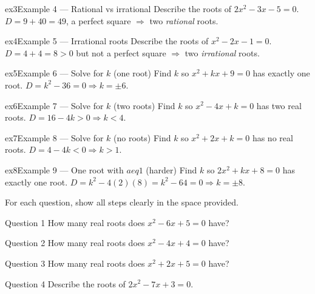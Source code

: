 \documentclass[11pt]{article}
\begin{document}
\begin{example}{ex3}{Example 4 --- Rational vs irrational}
Describe the roots of $2x^2-3x-5=0$.
\soln $D=9+40=49$, a perfect square $\Rightarrow$ two \emph{rational} roots.
\end{example}

\begin{example}{ex4}{Example 5 --- Irrational roots}
Describe the roots of $x^2-2x-1=0$.
\soln $D=4+4=8>0$ but not a perfect square $\Rightarrow$ two \emph{irrational} roots.
\end{example}

\begin{example}{ex5}{Example 6 --- Solve for $k$ (one root)}
Find $k$ so $x^2+kx+9=0$ has exactly one root.
\soln $D=k^2-36=0\Rightarrow k=\pm6.$
\end{example}

\begin{example}{ex6}{Example 7 --- Solve for $k$ (two roots)}
Find $k$ so $x^2-4x+k=0$ has two real roots.
\soln $D=16-4k>0\Rightarrow k<4.$
\end{example}

\begin{example}{ex7}{Example 8 --- Solve for $k$ (no roots)}
Find $k$ so $x^2+2x+k=0$ has no real roots.
\soln $D=4-4k<0\Rightarrow k>1.$
\end{example}

\begin{example}{ex8}{Example 9 --- One root with $a
eq1$ (harder)}
Find $k$ so $2x^2+kx+8=0$ has exactly one root.
\soln $D=k^2-4(2)(8)=k^2-64=0\Rightarrow k=\pm8.$
\end{example}

\clearpage
{}
For each question, show all steps clearly in the space provided.

\begin{qbox}{Question 1}
How many real roots does $x^2-6x+5=0$ have?\workspace{2.0cm}
\end{qbox}

\begin{qbox}{Question 2}
How many real roots does $x^2-4x+4=0$ have?\workspace{2.0cm}
\end{qbox}

\begin{qbox}{Question 3}
How many real roots does $x^2+2x+5=0$ have?\workspace{2.0cm}
\end{qbox}

\begin{qbox}{Question 4}
Describe the roots of $2x^2-7x+3=0$.\workspace{2.0cm}
\end{qbox}
\end{document}
